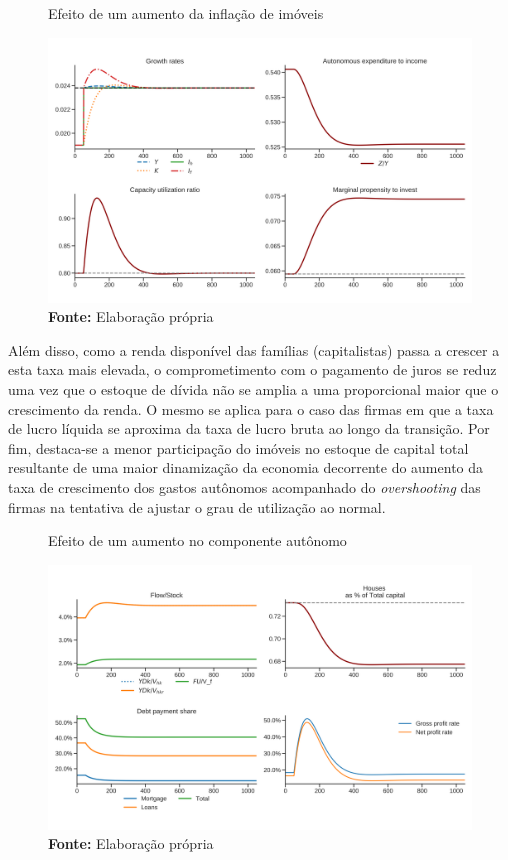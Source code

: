 \begin{figure}[H]
	\centering
	\caption{Efeito de um aumento da inflação de imóveis}
	\label{choque_4}
	\includegraphics[width=\textwidth]{../../Modelo/Versoes/Shock_4.png}
	\caption*{\textbf{Fonte:} Elaboração própria}
\end{figure}

Além disso, como a renda disponível das famílias (capitalistas) passa a crescer a esta taxa mais elevada, o comprometimento com o pagamento de juros se reduz uma vez que o estoque de dívida não se amplia a uma proporcional maior que o crescimento da renda. O mesmo se aplica para o caso das firmas em que a taxa de lucro líquida se aproxima da taxa de lucro bruta ao longo da transição. Por fim, destaca-se a menor participação do imóveis no estoque de capital total resultante de uma maior dinamização da economia decorrente do aumento da taxa de crescimento dos gastos autônomos acompanhado do \textit{overshooting} das firmas na tentativa de ajustar o grau de utilização ao normal.

\begin{figure}[H]
	\centering
	\caption{Efeito de um aumento no componente autônomo}
	\label{choque_1Norms}
	\includegraphics[width=\textwidth]{../../Modelo/Versoes/Shock_1Norms.png}
	\caption*{\textbf{Fonte:} Elaboração própria}
\end{figure}




